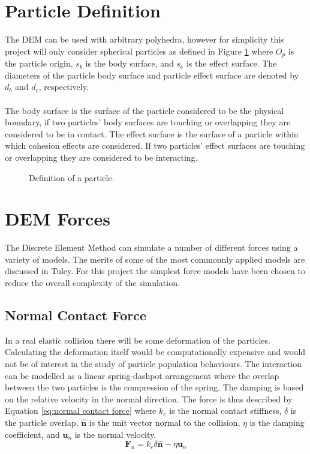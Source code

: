 \documentclass[a4paper,11pt,titlepage]{report}
\begin{document}
\section{Particle Definition}
The DEM can be used with arbitrary polyhedra, however for simplicity this project will only consider spherical particles as defined in Figure \ref{fig:particle} where $O_p$ is the particle origin, $s_b$ is the body surface, and $s_e$ is the effect surface. The diameters of the particle body surface and particle effect surface are denoted by $d_b$ and $d_e$, respectively.
\\\\The body surface is the surface of the particle considered to be the physical boundary, if two particles' body surfaces are touching or overlapping they are considered to be in contact. The effect surface is the surface of a particle within which cohesion effects are considered. If two particles' effect surfaces are touching or overlapping they are considered to be interacting.
\begin{figure}[!ht]
\centering

\caption{Definition of a particle.}
\label{fig:particle}
\end{figure}
\section{DEM Forces}
\label{sec:DEM Forces}
The Discrete Element Method can simulate a number of different forces using a variety of models. The merits of some of the most commonnly applied models are discussed in Tuley\cite{tuley}. For this project the simplest force models have been chosen to reduce the overall complexity of the simulation.
\subsection{Normal Contact Force}
In a real elastic collision there will be some deformation of the particles. Calculating the deformation itself would be computationally expensive and would not be of interest in the study of particle population behaviours. The interaction can be modelled as a linear spring-dashpot arrangement where the overlap between the two particles is the compression of the spring. The damping is based on the relative velocity in the normal direction. The force is thus described by Equation \ref{eq:normal contact force} where $k_{e}$ is the normal contact stiffness, $\delta$ is the particle overlap, $\mathbf{\hat{n}}$ is the unit vector normal to the collision, $\eta$ is the damping coefficient, and $\mathbf{u}_{n}$ is the normal velocity.
\begin{equation}
\mathbf{F}_{n} = k_{e} \delta \mathbf{\hat{n}} - \eta \mathbf{u}_{n}
\label{eq:normal contact force}
\end{equation}
\end{document}
